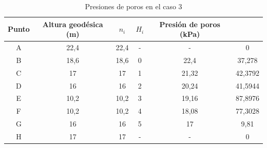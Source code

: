 \documentclass{article}
\begin{document}
  \begin{table}[h!]
    \centering
    \begin{tabular}{|cccccc}
    \hline
    \textbf{Punto} & \textbf{Altura geodésica (m)} & \textbf{$n_i$} & \textbf{$H_i$} & \textbf{Presión de poros (kPa)} \\ \hline
    A & 22,4 & 22,4 & - & - & 0 \\ 
    B & 18,6 & 18,6 & 0 & 22,4 & 37,278 \\ 
    C & 17 & 17 & 1 & 21,32 & 42,3792 \\ 
    D & 16 & 16 & 2 & 20,24 & 41,5944 \\ 
    E & 10,2 & 10,2 & 3 & 19,16 & 87,8976 \\ 
    F & 10,2 & 10,2 & 4 & 18,08 & 77,3028 \\ 
    G & 16 & 16 & 5 & 17 & 9,81 \\ 
    H & 17 & 17 & - & - & 0 \\ \hline
    \end{tabular}
    \caption{Presiones de poros en el caso 3}
    \end{table}
    
\end{document}
